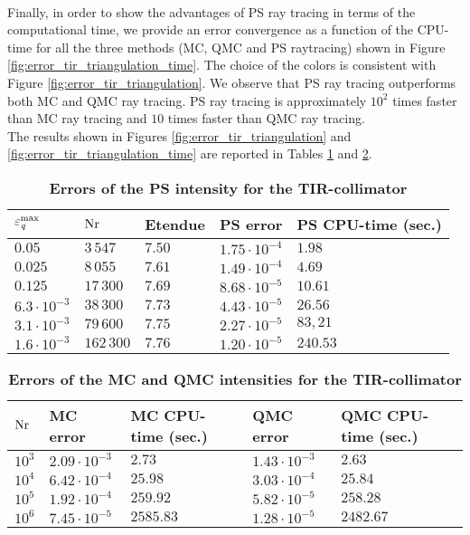 \\ \indent Finally, in order to show the advantages of PS ray tracing in terms of the computational time, we provide an error convergence as a function of the CPU-time for all the three methods (MC, QMC and PS raytracing) shown in Figure \ref{fig:error_tir_triangulation_time}. The choice of the colors is consistent with Figure \ref{fig:error_tir_triangulation}. We observe that PS ray tracing outperforms both MC and QMC ray tracing. PS ray tracing is approximately $10^2$ times faster than MC ray tracing and $10$ times faster than QMC ray tracing. \\ \indent The results shown in Figures \ref{fig:error_tir_triangulation} and \ref{fig:error_tir_triangulation_time} are reported in Tables \ref{tab:ps_error_triangulation} and \ref{tab:mc_error_triangulation}.
\begin{table}[t] 
\centering
\caption{\bf Errors of the PS intensity for the TIR-collimator}
\begin{tabular}{lllll}
 \hline   $\varepsilon_{\textit{q}}^{\textrm{max}} $  & $\textrm{Nr}$ & Etendue & PS error & PS CPU-time (sec.) \\
  \hline 
 $0.05$ & $3\,547$   & $7.50$   &  $1.75\cdot10^{-4}$ & $1.98$\\
$0.025$  & $8\,055$    & $7.61$    & $1.49\cdot 10^{-4}$ & $4.69$ \\
$0.125$  & $17\,300$    & $7.69$  & $8.68\cdot 10^{-5}$ & $10.61$\\
 $6.3 \cdot 10^{-3}$  & $38\,300$  & $7.73$   & $4.43\cdot 10^{-5}$ & $26.56$\\
 $3.1 \cdot 10^{-3}$ & $79\,600$  & $7.75$    & $2.27\cdot 10^{-5}$ & $83,21$\\
$1.6 \cdot 10^{-3}$ & $162\,300$  & $7.76$    & $1.20\cdot 10^{-5}$ & $240.53$\\
 \hline
 \end{tabular}
\label{tab:ps_error_triangulation}
 \end{table}
\begin{table}[t] \label{tab:table_tir_triangulation}
\centering
\caption{\bf Errors of the MC and QMC intensities for the TIR-collimator}
\begin{tabular}{lllll}
 \hline   $\textrm{Nr}$ & MC error & MC CPU-time (sec.) & QMC error  & QMC CPU-time (sec.)\\
  \hline 
 $10^3$     & $2.09\cdot 10^{-3}$ & $2.73$ & $1.43\cdot10^{-3}$    & $2.63$\\
 $10^4$     & $6.42\cdot 10^{-4}$ & $25.98$ & $3.03\cdot 10^{-4}$   & $25.84$\\
 $10^5$     & $1.92\cdot 10^{-4}$ & $259.92$ & $5.82\cdot 10^{-5}$   & $258.28$\\
 $10^6$     & $7.45\cdot 10^{-5}$ & $2585.83$   & $1.28\cdot 10^{-5}$   & $2482.67$\\
 \hline
 \end{tabular}
 \label{tab:mc_error_triangulation}
 \end{table}
